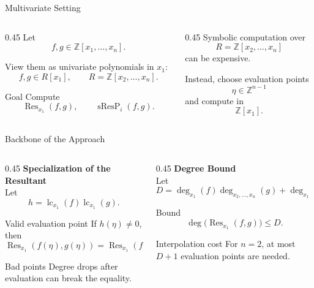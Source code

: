 \documentclass[aspectratio=169]{beamer}
\newcommand{\Res}{\operatorname{Res}}
\newcommand{\sResP}{\operatorname{sResP}}
\newcommand{\lc}{\operatorname{lc}}
\newcommand{\Z}{\mathbb{Z}}
\begin{document}
\begin{frame}{Multivariate Setting}
  \begin{columns}
    \begin{column}{0.45 \textwidth}
      Let
      \[
        f,g\in \Z[x_1,\dots,x_n].
      \]

      View them as univariate polynomials in $x_1$:
      \[
        f,g\in R[x_1], \qquad R=\Z[x_2,
      \dots,x_n].
      \]

      \begin{block}{Goal}
      Compute
      \[
        \Res_{x_1}(f,g), \qquad \sResP_i(f,g).
      \]
      \end{block}
    \end{column}
    \pause
    \begin{column}{0.45 \textwidth}
      Symbolic computation over
      \[
        R=\Z[x_2,\dots,x_n]
      \]
      can be expensive.

      \vspace{0.5em}
      Instead, choose evaluation points
      \[
        \eta\in\Z^{n-1}
      \]
      and compute in
      \[
        \Z[x_1].
      \]
    \end{column}
  \end{columns}
\end{frame}

\begin{frame}{Backbone of the Approach}
\footnotesize
\begin{columns}
  \begin{column}{0.45 \textwidth}
    \textbf{Specialization of the Resultant}\\
    Let
    \[
      h=\lc_{x_1}(f)\lc_{x_1}(g).
    \]


    \begin{block}{Valid evaluation point}
    If $h(\eta)\ne 0$, then
    \[
      \Res_{x_1}(f(\eta),g(\eta))
      =
      \Res_{x_1}(f,g)(\eta).
    \]
    \end{block}
    \pause
    \begin{alertblock}{Bad points}
    Degree drops after evaluation can break the equality.
    \end{alertblock}
  \end{column}
  \pause
  \begin{column}{0.45 \textwidth}
    \textbf{Degree Bound}\\
    Let
    \[
    D=\deg_{x_1}(f)\deg_{x_2,\dots,x_n}(g)
    +
    \deg_{x_1}(g)\deg_{x_2,\dots,x_n}(f).
    \]
    \pause
    \begin{block}{Bound}
    \[
      \deg\bigl(\Res_{x_1}(f,g)\bigr)\le D.
    \]
    \end{block}
    \pause
    \begin{block}{Interpolation cost}
    For $n=2$, at most $D+1$ evaluation points are needed.
    \end{block}
  \end{column}
\end{columns}
\end{frame}
\end{document}
